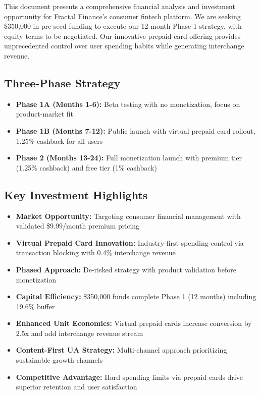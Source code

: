 \documentclass[11pt,letterpaper]{article}
\begin{document}
This document presents a comprehensive financial analysis and investment opportunity for Fractal Finance's consumer fintech platform. We are seeking \$350,000 in pre-seed funding to execute our 12-month Phase 1 strategy, with equity terms to be negotiated. Our innovative prepaid card offering provides unprecedented control over user spending habits while generating interchange revenue.

\subsection{Three-Phase Strategy}

\begin{itemize}[leftmargin=*]
\item \textbf{Phase 1A (Months 1-6):} Beta testing with no monetization, focus on product-market fit
\item \textbf{Phase 1B (Months 7-12):} Public launch with virtual prepaid card rollout, 1.25\% cashback for all users
\item \textbf{Phase 2 (Months 13-24):} Full monetization launch with premium tier (1.25\% cashback) and free tier (1\% cashback)
\end{itemize}

\subsection{Key Investment Highlights}

\begin{itemize}[leftmargin=*]
\item \textbf{Market Opportunity:} Targeting consumer financial management with validated \$9.99/month premium pricing
\item \textbf{Virtual Prepaid Card Innovation:} Industry-first spending control via transaction blocking with 0.4\% interchange revenue
\item \textbf{Phased Approach:} De-risked strategy with product validation before monetization
\item \textbf{Capital Efficiency:} \$350,000 funds complete Phase 1 (12 months) including 19.6\% buffer
\item \textbf{Enhanced Unit Economics:} Virtual prepaid cards increase conversion by 2.5x and add interchange revenue stream
\item \textbf{Content-First UA Strategy:} Multi-channel approach prioritizing sustainable growth channels
\item \textbf{Competitive Advantage:} Hard spending limits via prepaid cards drive superior retention and user satisfaction
\end{itemize}
\end{document}
